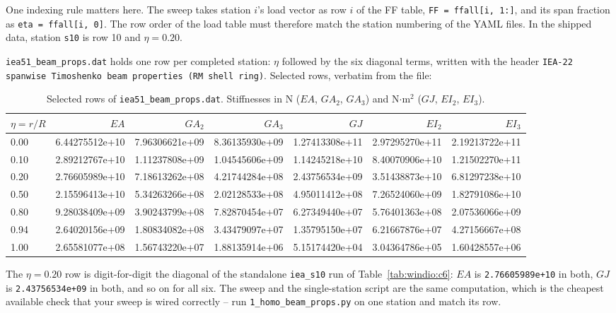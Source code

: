 One indexing rule matters here. The sweep takes station $i$'s load vector as
row $i$ of the FF table, \texttt{FF = ffall[i, 1:]}, and its span fraction as
\texttt{eta = ffall[i, 0]}. The row order of the load table must therefore match
the station numbering of the YAML files. In the shipped data, station
\texttt{s10} is row 10 and $\eta = 0.20$.

\texttt{iea51\_beam\_props.dat} holds one row per completed station: $\eta$
followed by the six diagonal terms, written with the header
\texttt{IEA-22 spanwise Timoshenko beam properties (RM shell ring)}. Selected
rows, verbatim from the file:

\begin{table}[htbp]
\centering
\footnotesize
\caption{Selected rows of \texttt{iea51\_beam\_props.dat}. Stiffnesses in N
         ($EA$, $GA_2$, $GA_3$) and N$\cdot$m$^2$ ($GJ$, $EI_2$, $EI_3$).}
\label{tab:windio:props}
\setlength{\tabcolsep}{3pt}
\begin{tabular}{lrrrrrr}
\toprule
$\eta = r/R$ & $EA$ & $GA_2$ & $GA_3$ & $GJ$ & $EI_2$ & $EI_3$ \\
\midrule
0.00 & 6.44275512e+10 & 7.96306621e+09 & 8.36135930e+09 & 1.27413308e+11 & 2.97295270e+11 & 2.19213722e+11 \\
0.10 & 2.89212767e+10 & 1.11237808e+09 & 1.04545606e+09 & 1.14245218e+10 & 8.40070906e+10 & 1.21502270e+11 \\
0.20 & 2.76605989e+10 & 7.18613262e+08 & 4.21744284e+08 & 2.43756534e+09 & 3.51438873e+10 & 6.81297238e+10 \\
0.50 & 2.15596413e+10 & 5.34263266e+08 & 2.02128533e+08 & 4.95011412e+08 & 7.26524060e+09 & 1.82791086e+10 \\
0.80 & 9.28038409e+09 & 3.90243799e+08 & 7.82870454e+07 & 6.27349440e+07 & 5.76401363e+08 & 2.07536066e+09 \\
0.94 & 2.64020156e+09 & 1.80834082e+08 & 3.43479097e+07 & 1.35795150e+07 & 6.21667876e+07 & 4.27156667e+08 \\
1.00 & 2.65581077e+08 & 1.56743220e+07 & 1.88135914e+06 & 5.15174420e+04 & 3.04364786e+05 & 1.60428557e+06 \\
\bottomrule
\end{tabular}
\end{table}

The $\eta = 0.20$ row is digit-for-digit the diagonal of the standalone
\texttt{iea\_s10} run of Table~\ref{tab:windio:c6}: $EA$ is
\texttt{2.76605989e+10} in both, $GJ$ is \texttt{2.43756534e+09} in both, and so
on for all six. The sweep and the single-station script are the same
computation, which is the cheapest available check that your sweep is wired
correctly -- run \texttt{1\_homo\_beam\_props.py} on one station and match its
row.

